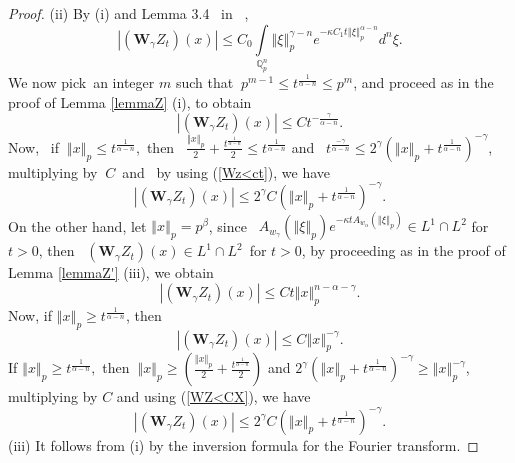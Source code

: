 \documentclass{amsart}\usepackage{amsfonts}
\theoremstyle{plain}
\numberwithin{equation}{section}
\begin{document}
\begin{proof}
(ii) By (i) and Lemma 3.4 \ in \ \cite{Ch-Z},\[
\left\vert (\mathbf{W}_{\gamma}Z_{t})(x)\right\vert \leq C_{0}\underset
{\mathbb{Q}_{p}^{n}}{\int}\left\Vert \xi\right\Vert _{p}^{\gamma-n}e^{-\kappa
C_{1}t\left\Vert \xi\right\Vert _{p}^{\alpha-n}}d^{n}\xi.
\]
We now pick\ an integer $m$ such that $\ p^{m-1}\leq t^{\frac{1}{\alpha-n}}\leq p^{m}$, and proceed as in the proof of Lemma \ref{lemmaZ} (i), to
obtain
\begin{equation}
\left\vert (\mathbf{W}_{\gamma}Z_{t})(x)\right\vert \leq Ct^{-\frac{\gamma
}{\alpha-n}}. \label{Wz<ct}\end{equation}
Now, \ if $\ \left\Vert x\right\Vert _{p}\leq t^{\frac{1}{\alpha-n}},$ then
\ $\frac{\left\Vert x\right\Vert _{p}}{2}+\frac{t^{\frac{1}{\alpha-n}}}{2}\leq
t^{\frac{1}{\alpha-n}}$ and \ $t^{\frac{-\gamma}{\alpha-n}}\leq2^{\gamma
}\left(  \left\Vert x\right\Vert _{p}+t^{\frac{1}{\alpha-n}}\right)
^{-\gamma}$, multiplying by $\ C$\ and \ by using (\ref{Wz<ct}), we have
\[
\left\vert (\mathbf{W}_{\gamma}Z_{t})(x)\right\vert \leq2^{\gamma}C\left(
\left\Vert x\right\Vert _{p}+t^{\frac{1}{\alpha-n}}\right)  ^{-\gamma}.
\]
On the other hand, let $\left\Vert x\right\Vert _{p}=p^{\beta}$, since
\ $A_{w_{\gamma}}(\left\Vert \xi\right\Vert _{p})e^{-\kappa tA_{w_{\alpha}}(\left\Vert \xi\right\Vert _{p})}\in L^{1}\cap L^{2}$ for $t>0$, then
\ $(\mathbf{W}_{\gamma}Z_{t})(x)\in L^{1}\cap L^{2}$\ for $t>0$, by proceeding
as in the proof of Lemma \ref{lemmaZ'} (iii), we obtain\[
\left\vert (\mathbf{W}_{\gamma}Z_{t})(x)\right\vert \leq Ct\left\Vert
x\right\Vert _{p}^{n-\alpha-\gamma}.
\]
Now, if $\left\Vert x\right\Vert _{p}\geq t^{\frac{1}{\alpha-n}}$, then
\begin{equation}
\left\vert (\mathbf{W}_{\gamma}Z_{t})(x)\right\vert \leq C\left\Vert
x\right\Vert _{p}^{-\gamma}. \label{WZ<CX}\end{equation}
If $\left\Vert x\right\Vert _{p}\geq t^{\frac{1}{\alpha-n}},$ then
$\ \left\Vert x\right\Vert _{p}\geq\left(  \frac{\left\Vert x\right\Vert _{p}}{2}+\frac{t^{\frac{1}{\alpha-n}}}{2}\right)  $ and $2^{\gamma}\left(
\left\Vert x\right\Vert _{p}+t^{\frac{1}{\alpha-n}}\right)  ^{-\gamma}\geq\left\Vert x\right\Vert _{p}^{-\gamma}$, multiplying by $C$ and using
(\ref{WZ<CX}), we have\
\[
\left\vert (\mathbf{W}_{\gamma}Z_{t})(x)\right\vert \leq2^{\gamma}C\left(
\left\Vert x\right\Vert _{p}+t^{\frac{1}{\alpha-n}}\right)  ^{-\gamma}.
\]
(iii) It follows from (i) by the inversion formula for the Fourier transform.
\end{proof}
\end{document}
